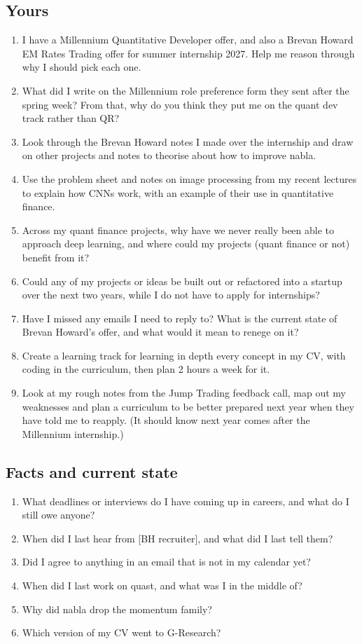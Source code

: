 \documentclass[10pt]{extarticle}
\newcommand{\Sub}[1]{\subsection*{#1}}
\begin{document}
\Sub{Yours}
{\small\begin{enumerate}[label=Y\arabic*.]
\item I have a Millennium Quantitative Developer offer, and also a Brevan Howard EM Rates Trading offer for summer internship 2027. Help me reason through why I should pick each one.
\item What did I write on the Millennium role preference form they sent after the spring week? From that, why do you think they put me on the quant dev track rather than QR?
\item Look through the Brevan Howard notes I made over the internship and draw on other projects and notes to theorise about how to improve nabla.
\item Use the problem sheet and notes on image processing from my recent lectures to explain how CNNs work, with an example of their use in quantitative finance.
\item Across my quant finance projects, why have we never really been able to approach deep learning, and where could my projects (quant finance or not) benefit from it?
\item Could any of my projects or ideas be built out or refactored into a startup over the next two years, while I do not have to apply for internships?
\item Have I missed any emails I need to reply to? What is the current state of Brevan Howard's offer, and what would it mean to renege on it?
\item Create a learning track for learning in depth every concept in my CV, with coding in the curriculum, then plan 2 hours a week for it.
\item Look at my rough notes from the Jump Trading feedback call, map out my weaknesses and plan a curriculum to be better prepared next year when they have told me to reapply. (It should know next year comes after the Millennium internship.)
\end{enumerate}}

\Sub{Facts and current state}
{\small\begin{enumerate}[label=\arabic*.]
\item What deadlines or interviews do I have coming up in careers, and what do I still owe anyone?
\item When did I last hear from [BH recruiter], and what did I last tell them?
\item Did I agree to anything in an email that is not in my calendar yet?
\item When did I last work on quast, and what was I in the middle of?
\item Why did nabla drop the momentum family?
\item Which version of my CV went to G-Research?
\end{enumerate}}
\end{document}
